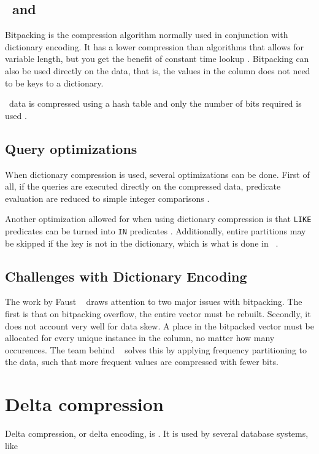 \subsection{\de~and \bp}
\label{sub:Dictionary Encoding and Bitpacking}
Bitpacking is the compression algorithm normally used in conjunction with dictionary encoding. It has a lower compression than algorithms that allows for variable length, but you get the benefit of constant time lookup \cite{Raman2008-gi}. Bitpacking can also be used directly on the data, that is, the values in the column does not need to be keys to a dictionary.

\qlikview~data is compressed using a hash table and only the number of bits required is used \cite{Qlik2014-vd}.

\subsection{Query optimizations}
\label{sub:Query optimizations}
When dictionary compression is used, several optimizations can be done. First of all, if the queries are executed directly on the compressed data, predicate evaluation are reduced to simple integer comparisons \cite{Johnson2008-cp}.  

Another optimization allowed for when using dictionary compression is that \texttt{LIKE} predicates can be turned into \texttt{IN} predicates \cite{Barber2012-xt}. Additionally, entire partitions may be skipped if the key is not in the dictionary, which is what is done in \blink~\cite{Barber2012-xt}.

\subsection{Challenges with Dictionary Encoding}
\label{sub:Challenges with Dictionary Encoding}
The work by Faust \ea~\cite{Faust2015-ke} draws attention to two major issues with bitpacking. The first is that on bitpacking overflow, the entire vector must be rebuilt. Secondly, it does not account very well for data skew. A place in the bitpacked vector must be allocated for every unique instance in the column, no matter how many occurences. The team behind \blink~\cite{Raman2008-gi} solves this by applying frequency partitioning to the data, such that more frequent values are compressed with fewer bits.

\section{Delta compression}
\label{sec:Delta compression}
Delta compression, or delta encoding, is . It is used by several database systems, like ~\cite{Raman2008-gi}

